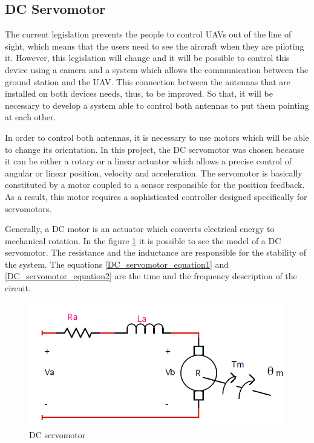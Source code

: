 \subsection*{DC Servomotor}

The current legislation prevents the people to control UAVs out of the line of sight, which means that the users need to see the aircraft when they are piloting it. However, this legislation will change and it will be possible to control this device using a camera and a system which allows the communication between the ground station and the UAV. This connection between the antennas that are installed on both devices needs, thus, to be improved. So that, it will be necessary to develop a system able to control both antennas to put them pointing at each other.

In order to control both antennas, it is necessary to use motors which will be able to change its orientation. In this project, the DC servomotor was chosen because it can be either a rotary or a linear actuator which allows a precise control of angular or linear position, velocity and acceleration. The servomotor is basically constituted by a motor coupled to a sensor responsible for the position feedback. As a result, this motor requires a sophisticated controller designed specifically for servomotors.

Generally, a DC motor is an actuator which converts electrical energy to mechanical rotation. In the figure \ref{DC_servomotor_circuit} it is possible to see the model of a DC servomotor. The resistance and the inductance are responsible for the stability of the system. The equations \ref{DC_servomotor_equation1} and \ref{DC_servomotor_equation2} are the time and the frequency description of the circuit.

\begin{figure}[H]
\centering
\includegraphics[scale=0.5]{figures/servomotor.png}
\caption{DC servomotor}
\label{DC_servomotor_circuit}
\end{figure}

